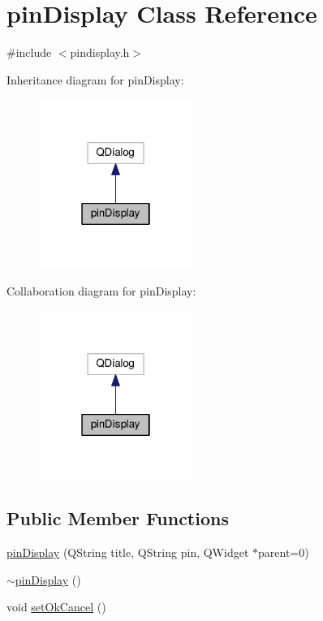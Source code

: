 \hypertarget{classpinDisplay}{}\section{pin\+Display Class Reference}
\label{classpinDisplay}


{\ttfamily \#include $<$pindisplay.\+h$>$}



Inheritance diagram for pin\+Display\+:
\nopagebreak
\begin{figure}[H]
\begin{center}
\leavevmode
\includegraphics[width=142pt]{classpinDisplay__inherit__graph}
\end{center}
\end{figure}


Collaboration diagram for pin\+Display\+:
\nopagebreak
\begin{figure}[H]
\begin{center}
\leavevmode
\includegraphics[width=142pt]{classpinDisplay__coll__graph}
\end{center}
\end{figure}
\subsection*{Public Member Functions}
\begin{DoxyCompactItemize}
\item 
\hyperlink{classpinDisplay_a36cbc413bef6dbb2b35d22034e09d954}{pin\+Display} (Q\+String title, Q\+String pin, Q\+Widget $\ast$parent=0)
\item 
\hyperlink{classpinDisplay_a9f0d6882b7e823bf510390701f5e2f85}{$\sim$pin\+Display} ()
\item 
void \hyperlink{classpinDisplay_a1a00155d5f7c1e3c1c7512cf5a2670af}{set\+Ok\+Cancel} ()
\end{DoxyCompactItemize}


